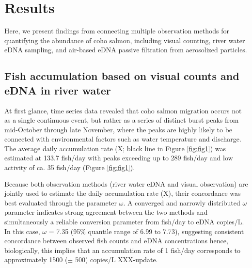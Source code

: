 \documentclass{article}
\begin{document}
\clearpage
\section{Results}
Here, we present findings from connecting multiple observation methods for quantifying the abundance of coho salmon, including visual counting, river water eDNA sampling, and air-based eDNA passive filtration from aerosolized particles.

\subsection{Fish accumulation based on visual counts and eDNA in river water}
At first glance, time series data revealed that coho salmon migration occurs not as a single continuous event, but rather as a series of distinct burst peaks from mid-October through late November, where the peaks are highly likely to be connected with environmental factors such as water temperature and discharge. The average daily accumulation rate (X; black line in Figure \ref{fig:fig1}) was estimated at 133.7 fish/day with peaks exceeding up to 289 fish/day and low activity of ca. 35 fish/day (Figure \ref{fig:fig1}).


Because both observation methods (river water eDNA and visual observation) are jointly used to estimate the daily accumulation rate (X), their concordance was best evaluated through the parameter $\omega$. A converged and narrowly distributed $\omega$ parameter indicates strong agreement between the two methods and simultaneously a reliable conversion parameter from fish/day to eDNA copies/L. In this case, $\omega$ = 7.35 (95\% quantile range of 6.99 to 7.73), suggesting consistent concordance between observed fish counts and eDNA concentrations hence, biologically, this implies that an accumulation rate of 1 fish/day corresponds to approximately 1500 ($\pm$ 500) copies/L XXX-update.
\end{document}
